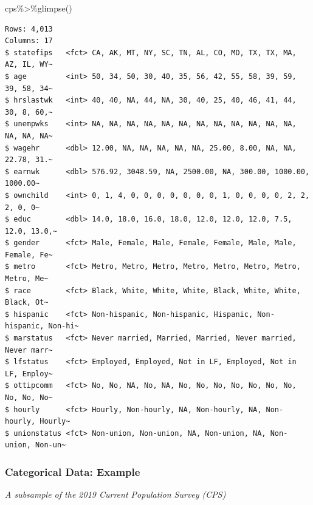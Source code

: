 \documentclass[
  letterpaper,
  DIV=11,
  numbers=noendperiod]{scrartcl}
\newenvironment{Shaded}{\begin{snugshade}}{\end{snugshade}}
\newcommand{\FunctionTok}[1]{\textcolor[rgb]{0.28,0.35,0.67}{#1}}
\newcommand{\NormalTok}[1]{\textcolor[rgb]{0.00,0.23,0.31}{#1}}
\newcommand{\SpecialCharTok}[1]{\textcolor[rgb]{0.37,0.37,0.37}{#1}}
\begin{document}
\begin{Shaded}
\begin{Highlighting}[]
\NormalTok{cps}\SpecialCharTok{\%\textgreater{}\%}\FunctionTok{glimpse}\NormalTok{()}
\end{Highlighting}
\end{Shaded}

\begin{verbatim}
Rows: 4,013
Columns: 17
$ statefips   <fct> CA, AK, MT, NY, SC, TN, AL, CO, MD, TX, TX, MA, AZ, IL, WY~
$ age         <int> 50, 34, 50, 30, 40, 35, 56, 42, 55, 58, 39, 59, 39, 58, 34~
$ hrslastwk   <int> 40, 40, NA, 44, NA, 30, 40, 25, 40, 46, 41, 44, 30, 8, 60,~
$ unempwks    <int> NA, NA, NA, NA, NA, NA, NA, NA, NA, NA, NA, NA, NA, NA, NA~
$ wagehr      <dbl> 12.00, NA, NA, NA, NA, NA, 25.00, 8.00, NA, NA, 22.78, 31.~
$ earnwk      <dbl> 576.92, 3048.59, NA, 2500.00, NA, 300.00, 1000.00, 1000.00~
$ ownchild    <int> 0, 1, 4, 0, 0, 0, 0, 0, 0, 0, 1, 0, 0, 0, 0, 2, 2, 2, 0, 0~
$ educ        <dbl> 14.0, 18.0, 16.0, 18.0, 12.0, 12.0, 12.0, 7.5, 12.0, 13.0,~
$ gender      <fct> Male, Female, Male, Female, Female, Male, Male, Female, Fe~
$ metro       <fct> Metro, Metro, Metro, Metro, Metro, Metro, Metro, Metro, Me~
$ race        <fct> Black, White, White, White, Black, White, White, Black, Ot~
$ hispanic    <fct> Non-hispanic, Non-hispanic, Hispanic, Non-hispanic, Non-hi~
$ marstatus   <fct> Never married, Married, Married, Never married, Never marr~
$ lfstatus    <fct> Employed, Employed, Not in LF, Employed, Not in LF, Employ~
$ ottipcomm   <fct> No, No, NA, No, NA, No, No, No, No, No, No, No, No, No, No~
$ hourly      <fct> Hourly, Non-hourly, NA, Non-hourly, NA, Non-hourly, Hourly~
$ unionstatus <fct> Non-union, Non-union, NA, Non-union, NA, Non-union, Non-un~
\end{verbatim}

\subsubsection{Categorical Data:
Example}\label{categorical-data-example}

\emph{A subsample of the 2019 Current Population Survey (CPS)}

\begin{Shaded}
\end{Shaded}
\end{document}
